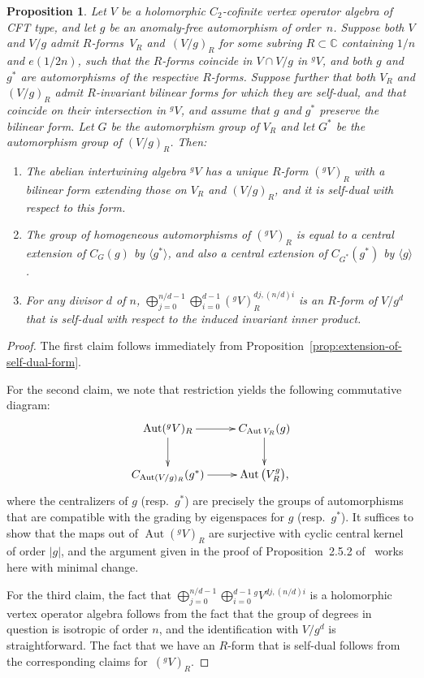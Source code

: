 \documentclass[pdftex]{sigma}
\newcommand{\bC}{\mathbb{C}}
\DeclareMathOperator{\Aut}{Aut}
\newtheorem{prop}[thm]{Proposition}
\theoremstyle{definition}
\begin{document}
\begin{prop} \label{prop:R-form-for-abelian-intertwining-algebra}Let $V$ be a holomorphic $C_2$-cofinite vertex operator algebra of CFT type, and let $g$ be an anomaly-free automorphism of order~$n$. Suppose both $V$ and $V/g$ admit $R$-forms~$V_R$ and~$(V/g)_R$ for some subring $R \subset \bC$ containing $1/n$ and $e(1/2n)$, such that the $R$-forms coincide in $V \cap V/g$ in ${}^gV$, and both $g$ and $g^*$ are automorphisms of the respective $R$-forms. Suppose further that both $V_R$ and $(V/g)_R$ admit $R$-invariant bilinear forms for which they are self-dual, and that coincide on their intersection in ${}^gV$, and assume that $g$ and $g^*$ preserve the bilinear form. Let $G$ be the automorphism group of $V_R$ and let $G^*$ be the automorphism group of $(V/g)_R$. Then:
\begin{enumerate}\itemsep=0pt
\item[$1.$] The abelian intertwining algebra ${}^gV$ has a unique $R$-form $({}^gV)_R$ with a bilinear form extending those on $V_R$ and $(V/g)_R$, and it is self-dual with respect to this form.
\item[$2.$] The group of homogeneous automorphisms of $({}^gV)_R$ is equal to a central extension of $C_G(g)$ by $\langle g^* \rangle$, and also a central extension of $C_{G^*}(g^*)$ by $\langle g \rangle$.
\item[$3.$] For any divisor $d$ of $n$, $\bigoplus_{j=0}^{n/d-1} \bigoplus_{i=0}^{d-1} ({}^gV)_R^{dj,(n/d)i}$ is an $R$-form of $V/g^d$ that is self-dual with respect to the induced invariant inner product.
\end{enumerate}
\end{prop}
\begin{proof}The first claim follows immediately from Proposition~\ref{prop:extension-of-self-dual-form}.

For the second claim, we note that restriction yields the following commutative diagram:
\begin{gather*} \xymatrix{ \Aut({}^gV)_R \ar[r] \ar[d] & C_{\Aut V_R}(g) \ar[d] \\ C_{\Aut (V/g)_R}(g^*) \ar[r] & \Aut \big(V_R^g\big), } \end{gather*}
where the centralizers of $g$ (resp.~$g^*$) are precisely the groups of automorphisms that are compatible with the grading by eigenspaces for $g$ (resp.~$g^*$). It suffices to show that the maps out of $\Aut({}^gV)_R$ are surjective with cyclic central kernel of order $|g|$, and the argument given in the proof of Proposition~2.5.2 of~\cite{GM4} works here with minimal change.

For the third claim, the fact that $\bigoplus_{j=0}^{n/d-1} \bigoplus_{i=0}^{d-1} {}^gV^{dj,(n/d)i}$ is a holomorphic vertex operator algebra follows from the fact that the group of degrees in question is isotropic of order $n$, and the identification with $V/g^d$ is straightforward. The fact that we have an $R$-form that is self-dual follows from the corresponding claims for~$({}^gV)_R$.
\end{proof}
\end{document}
